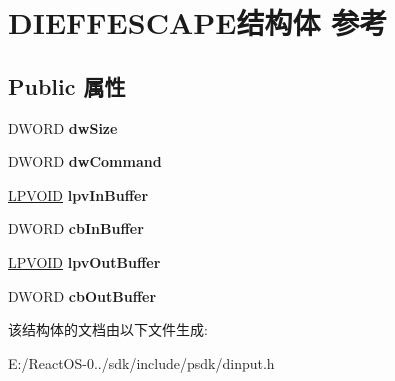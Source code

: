 \hypertarget{struct_d_i_e_f_f_e_s_c_a_p_e}{}\section{D\+I\+E\+F\+F\+E\+S\+C\+A\+P\+E结构体 参考}
\label{struct_d_i_e_f_f_e_s_c_a_p_e}
\subsection*{Public 属性}
\begin{DoxyCompactItemize}
\item 
\mbox{\label{struct_d_i_e_f_f_e_s_c_a_p_e_a5fa7e3ee822a2c9d0dad5e603e2698a0}} 
D\+W\+O\+RD {\bfseries dw\+Size}
\item 
\mbox{\label{struct_d_i_e_f_f_e_s_c_a_p_e_ab55738eb4285e685ec463b7bbeb45fae}} 
D\+W\+O\+RD {\bfseries dw\+Command}
\item 
\mbox{\label{struct_d_i_e_f_f_e_s_c_a_p_e_ab07b11ed1cb5d4dea7d5daa14cf35f9a}} 
\hyperlink{interfacevoid}{L\+P\+V\+O\+ID} {\bfseries lpv\+In\+Buffer}
\item 
\mbox{\label{struct_d_i_e_f_f_e_s_c_a_p_e_aa6d0bc24a18e7388776679a5dd6eacf1}} 
D\+W\+O\+RD {\bfseries cb\+In\+Buffer}
\item 
\mbox{\label{struct_d_i_e_f_f_e_s_c_a_p_e_a3a2b894ec95df891829bd30c41b18fc3}} 
\hyperlink{interfacevoid}{L\+P\+V\+O\+ID} {\bfseries lpv\+Out\+Buffer}
\item 
\mbox{\label{struct_d_i_e_f_f_e_s_c_a_p_e_a2da389e18a79ecb19fb7860a76195315}} 
D\+W\+O\+RD {\bfseries cb\+Out\+Buffer}
\end{DoxyCompactItemize}


该结构体的文档由以下文件生成\+:\begin{DoxyCompactItemize}
\item 
E\+:/\+React\+O\+S-\/0../sdk/include/psdk/dinput.\+h\end{DoxyCompactItemize}
